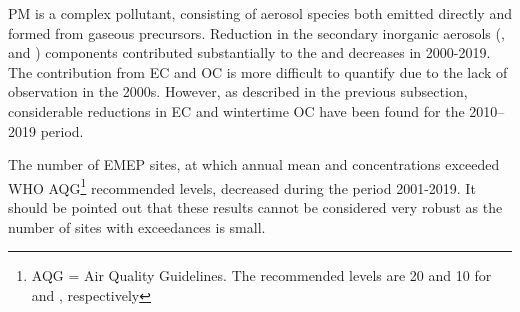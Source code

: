 PM is a complex pollutant, consisting of aerosol species both emitted directly and formed from gaseous precursors. 
Reduction in the secondary inorganic aerosols (\soiv, \noiii and \nhiv) components contributed substantially to the \PM[10] and \PM[2.5] decreases in 2000-2019. The contribution from EC and OC is more difficult to quantify due to the lack of observation in the 2000s. However, as described in the previous subsection, considerable reductions in EC and wintertime OC have been found for the 2010--2019 period.  


The number of EMEP sites, at which annual mean \PM[10] and \PM[2.5] concentrations exceeded WHO AQG\footnote{AQG = Air Quality Guidelines. The recommended levels are 20 and 10 \ug for \PM[10] and \PM[2.5], respectively } recommended levels, decreased during the period 2001-2019. It should be pointed out that these results cannot be considered very robust as the number of sites with exceedances is small. 



